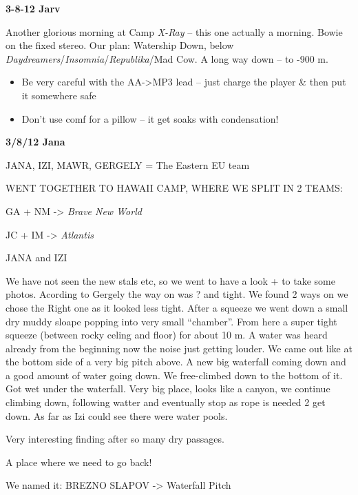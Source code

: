 \textbf{3-8-12 Jarv}

Another glorious morning at Camp \emph{X-Ray} -- this one actually a
morning. Bowie on the fixed stereo. Our plan: Watership Down, below
\emph{Daydreamers}/\emph{Insomnia}/\emph{Republika}/Mad Cow. A long way
down -- to -900 m.

\begin{itemize}
\tightlist
\item
  Be very careful with the AA-\textgreater{}MP3 lead -- just charge the
  player \& then put it somewhere safe
\item
  Don't use comf for a pillow -- it get soaks with condensation!
\end{itemize}

\textbf{3/8/12 Jana}

JANA, IZI, MAWR, GERGELY = The Eastern EU team

WENT TOGETHER TO HAWAII CAMP, WHERE WE SPLIT IN 2 TEAMS:

GA + NM -\textgreater{} \emph{Brave New World}

JC + IM -\textgreater{} \emph{Atlantis}

JANA and IZI

We have not seen the new stals etc, so we went to have a look + to take
some photos. Acording to Gergely the way on was ? and tight. We found 2
ways on we chose the Right one as it looked less tight. After a squeeze
we went down a small dry muddy sloape popping into very small
``chamber''. From here a super tight squeeze (between rocky celing and
floor) for about 10 m. A water was heard already from the beginning now
the noise just getting louder. We came out like at the bottom side of a
very big pitch above. A new big waterfall coming down and a good amount
of water going down. We free-climbed down to the bottom of it. Got wet
under the waterfall. Very big place, looks like a canyon, we continue
climbing down, following watter and eventually stop as rope is needed 2
get down. As far as Izi could see there were water pools.

Very interesting finding after so many dry passages.

A place where we need to go back!

We named it: BREZNO SLAPOV -\textgreater{} Waterfall Pitch

